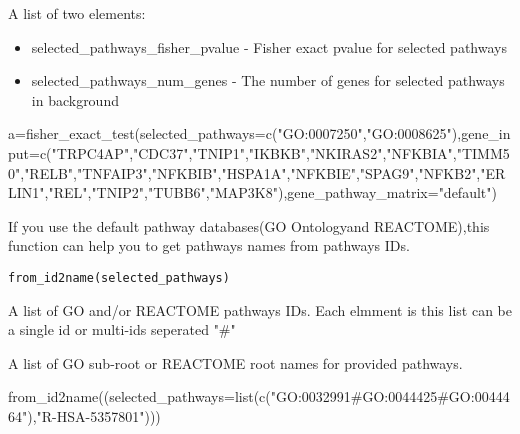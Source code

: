 \documentclass[a4paper]{book}
\begin{document}
%
\begin{Value}
A list of two elements:
\begin{itemize}

\item selected\_pathways\_fisher\_pvalue - Fisher exact pvalue for selected pathways
\item selected\_pathways\_num\_genes - The number of genes for selected pathways in background

\end{itemize}

\end{Value}
%
\begin{Examples}
\begin{ExampleCode}
a=fisher_exact_test(selected_pathways=c("GO:0007250","GO:0008625"),gene_input=c("TRPC4AP","CDC37","TNIP1","IKBKB","NKIRAS2","NFKBIA","TIMM50","RELB","TNFAIP3","NFKBIB","HSPA1A","NFKBIE","SPAG9","NFKB2","ERLIN1","REL","TNIP2","TUBB6","MAP3K8"),gene_pathway_matrix="default")
\end{ExampleCode}
\end{Examples}
%
\begin{Description}\relax
If you use the default pathway databases(GO Ontologyand REACTOME),this function can help you to get pathways names from pathways IDs.
\end{Description}
%
\begin{Usage}
\begin{verbatim}
from_id2name(selected_pathways)
\end{verbatim}
\end{Usage}
%
\begin{Arguments}
\begin{ldescription}
\item[\code{selected\_pathways}] A list of GO and/or REACTOME pathways IDs. Each elmment is this list can be a single id or multi-ids seperated "\#"
\end{ldescription}
\end{Arguments}
%
\begin{Value}
A list of GO sub-root or REACTOME root names for provided pathways.
\end{Value}
%
\begin{Examples}
\begin{ExampleCode}
from_id2name((selected_pathways=list(c("GO:0032991#GO:0044425#GO:0044464"),"R-HSA-5357801")))
\end{ExampleCode}
\end{Examples}
\end{document}
